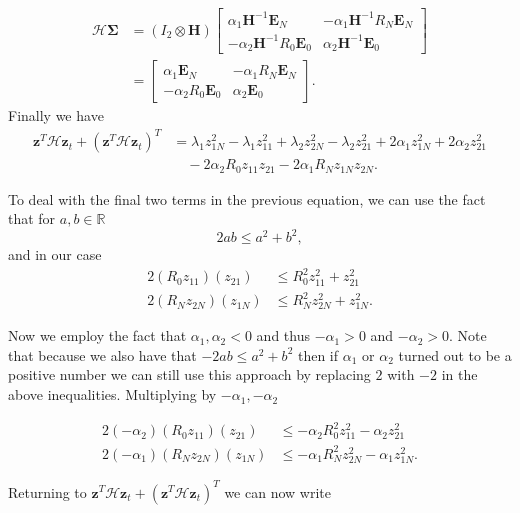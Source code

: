 \documentclass[12pt]{article}
\begin{document}
\begin{flushleft}
\begin{align*}
\mathcal{H}\boldsymbol{\Sigma} &=
(I_2 \otimes \boldsymbol{H}) \begin{bmatrix}
\alpha_1 \boldsymbol{H}^{-1} \boldsymbol{E}_N & -\alpha_1 \boldsymbol{H}^{-1} R_N \boldsymbol{E}_N \\
-\alpha_2 \boldsymbol{H}^{-1} R_0 \boldsymbol{E}_0 & \alpha_2\boldsymbol{H}^{-1} \boldsymbol{E}_0
\end{bmatrix}\\
 &= \begin{bmatrix}
\alpha_1 \boldsymbol{E}_N & -\alpha_1 R_N \boldsymbol{E}_N \\
-\alpha_2 R_0 \boldsymbol{E}_0 & \alpha_2 \boldsymbol{E}_0
\end{bmatrix}.
\end{align*}
 Finally we have
\begin{align*}
\mathbf{z}^{T} \mathcal{H} \mathbf{z}_t + (\mathbf{z}^{T}\mathcal{H} \mathbf{z}_t)^{T} &=  \lambda_1 z_{1N}^2 - \lambda_1 z_{11}^2 + \lambda_2 z_{2N}^2 - \lambda_2 z_{21}^2
+ 2\alpha_1 z_{1N}^2 + 2 \alpha_2 z_{21}^2\\
& \quad - 2\alpha_2 R_0 z_{11}z_{21} - 2\alpha_1 R_N z_{1N}z_{2N}.
\end{align*}

To deal with the final two terms in the previous equation, we can use the fact that for $a,b \in \mathbb{R}$
$$2ab \leq a^2 + b^2,$$
and in our case
\begin{align*}
2 ( R_0 z_{11})(z_{21}) &\leq  R_0^2 z_{11}^2 +  z_{21}^2\\
2 ( R_N z_{2N})(z_{1N}) &\leq  R_N^2 z_{2N}^2 + z_{1N}^2.
\end{align*}

Now we employ the fact that $\alpha_1, \alpha_2 < 0$ and thus $-\alpha_1 > 0$ and $-\alpha_2 >0$. Note that because we also have that $-2ab \leq a^2 +b^2$ then if $\alpha_1$ or $\alpha_2$ turned out to be  a positive number we can still use this approach by replacing $2$ with $-2$ in the above inequalities. Multiplying by $-\alpha_1, -\alpha_2$

\begin{align*}
2(-\alpha_2) ( R_0 z_{11})(z_{21}) &\leq  -\alpha_2 R_0^2 z_{11}^2 -  \alpha_2 z_{21}^2\\
2(-\alpha_1) ( R_N z_{2N})(z_{1N}) &\leq  -\alpha_1 R_N^2 z_{2N}^2 -\alpha_1  z_{1N}^2.
\end{align*}

Returning to $\mathbf{z}^{T} \mathcal{H} \mathbf{z}_t + (\mathbf{z}^{T}\mathcal{H} \mathbf{z}_t)^{T}$ we can now write


\end{flushleft}
\end{document}
